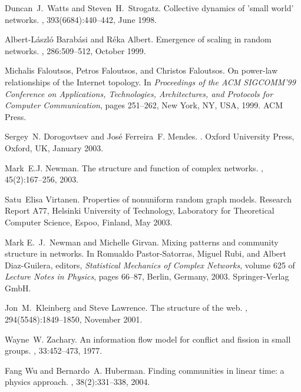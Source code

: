 \documentclass{article}
\begin{document}
\begin{thebibliography}{10}

Duncan~J.\ Watts and Steven~H.\ Strogatz.
\newblock Collective dynamics of 'small world' networks.
, 393(6684):440--442, June 1998.

Albert-L\'{a}szl\'{o} Barab\'{a}si and R\'{e}ka Albert.
\newblock Emergence of scaling in random networks.
, 286:509--512, October 1999.

Michalis Faloutsos, Petros Faloutsos, and Christos Faloutsos.
\newblock On power-law relationships of the {I}nternet topology.
\newblock In {\em Proceedings of the {ACM} {SIGCOMM}'99 Conference on
  Applications, Technologies, Architectures, and Protocols for Computer
  Communication}, pages 251--262, New York, NY, USA, 1999. {ACM} Press.

Sergey~N. Dorogovtsev and Jos\'{e} Ferreira~F. Mendes.
.
\newblock Oxford University Press, Oxford, UK, January 2003.

Mark~E.J. Newman.
\newblock The structure and function of complex networks.
, 45(2):167--256, 2003.

Satu~Elisa Virtanen.
\newblock Properties of nonuniform random graph models.
\newblock Research Report A77, Helsinki University of Technology, Laboratory
  for Theoretical Computer Science, Espoo, Finland, May 2003.

Mark E.~J.\ Newman and Michelle Girvan.
\newblock Mixing patterns and community structure in networks.
\newblock In Romualdo Pastor-Satorras, Miguel Rubi, and Albert Diaz-Guilera,
  editors, {\em Statistical Mechanics of Complex Networks}, volume 625 of {\em
  Lecture Notes in Physics}, pages 66--87, Berlin, Germany, 2003.
  Springer-Verlag GmbH.

Jon~M.\ Kleinberg and Steve Lawrence.
\newblock The structure of the web.
, 294(5548):1849--1850, November 2001.

Wayne~W. Zachary.
\newblock An information flow model for conflict and fission in small groups.
, 33:452--473, 1977.

Fang Wu and Bernardo~A. Huberman.
\newblock Finding communities in linear time: a physics approach.
, 38(2):331--338, 2004.


\end{thebibliography}
\end{document}
